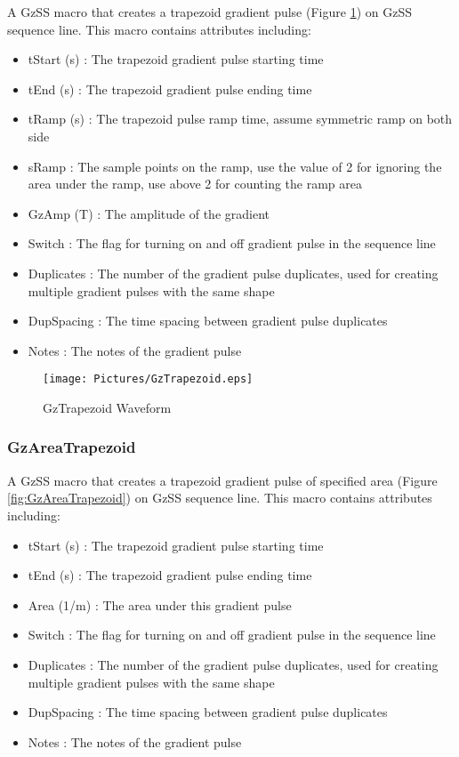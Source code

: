 \documentclass{book}%
\begin{document}
A GzSS macro that creates a trapezoid gradient pulse (Figure \ref{fig:GzTrapezoid}) on GzSS sequence line. This macro contains attributes including:

\begin{itemize}
	\item tStart (s) : The trapezoid gradient pulse starting time
	\item tEnd (s) : The trapezoid gradient pulse ending time
	\item tRamp (s) : The trapezoid pulse ramp time, assume symmetric ramp on both side
	\item sRamp : The sample points on the ramp, use the value of 2 for ignoring the area under the ramp, use above 2 for counting the ramp area
	\item GzAmp (T) : The amplitude of the gradient
	\item Switch : The flag for turning on and off gradient pulse in the sequence line
	\item Duplicates : The number of the gradient pulse duplicates, used for creating multiple gradient pulses with the same shape
	\item DupSpacing : The time spacing between gradient pulse duplicates
	\item Notes : The notes of the gradient pulse 
\end{itemize}

\begin{figure}[htbp]
	\centering
		\texttt{[image: Pictures/GzTrapezoid.eps]}
	\caption{GzTrapezoid Waveform}
	\label{fig:GzTrapezoid}
\end{figure}		


\subsubsection{GzAreaTrapezoid}

A GzSS macro that creates a trapezoid gradient pulse of specified area (Figure \ref{fig:GzAreaTrapezoid}) on GzSS sequence line. This macro contains attributes including:

\begin{itemize}
	\item tStart (s) : The trapezoid gradient pulse starting time
	\item tEnd (s) : The trapezoid gradient pulse ending time
	\item Area (1/m) : The area under this gradient pulse
	\item Switch : The flag for turning on and off gradient pulse in the sequence line
	\item Duplicates : The number of the gradient pulse duplicates, used for creating multiple gradient pulses with the same shape
	\item DupSpacing : The time spacing between gradient pulse duplicates
	\item Notes : The notes of the gradient pulse 
\end{itemize}
\end{document}
